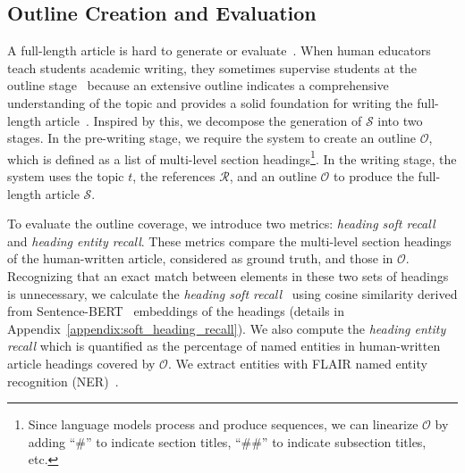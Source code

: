 \subsection{Outline Creation and Evaluation}
\label{sec:task_outline}


A full-length article is hard to generate or evaluate~\citep{xu-etal-2023-critical, krishna-etal-2023-longeval}. When human educators teach students academic writing, they sometimes supervise students at the outline stage~\citep{eriksson2015supervision} because an extensive outline indicates a comprehensive understanding of the topic and provides a solid foundation for writing the full-length article~\citep{dietz2019trec}. Inspired by this, we decompose the generation of $\mathcal{S}$ into two stages. In the pre-writing stage, we require the system to create an outline $\mathcal{O}$, which is defined as a list of multi-level section headings\footnote{Since language models process and produce sequences, we can linearize $\mathcal{O}$ by adding ``\#'' to indicate section titles, ``\#\#'' to indicate subsection titles, etc.}. In the writing stage, the system uses the topic $t$, the references $\mathcal{R}$, and an outline $\mathcal{O}$ to produce the full-length article $\mathcal{S}$.


To evaluate the outline coverage, we introduce two metrics: \textit{heading soft recall} and \textit{heading entity recall}. These metrics compare the multi-level section headings of the human-written article, considered as ground truth, and those in $\mathcal{O}$. Recognizing that an exact match between elements in these two sets of headings is unnecessary, we calculate the \textit{heading soft recall}~\citep{franti2023soft} using cosine similarity derived from Sentence-BERT~\citep{reimers-gurevych-2019-sentence} embeddings of the headings (details in Appendix~\ref{appendix:soft_heading_recall}).
We also compute the \textit{heading entity recall} which is quantified as the percentage of named entities in human-written article headings covered by $\mathcal{O}$. We extract entities with FLAIR named entity recognition (NER)~\citep{akbik-etal-2019-flair}.

